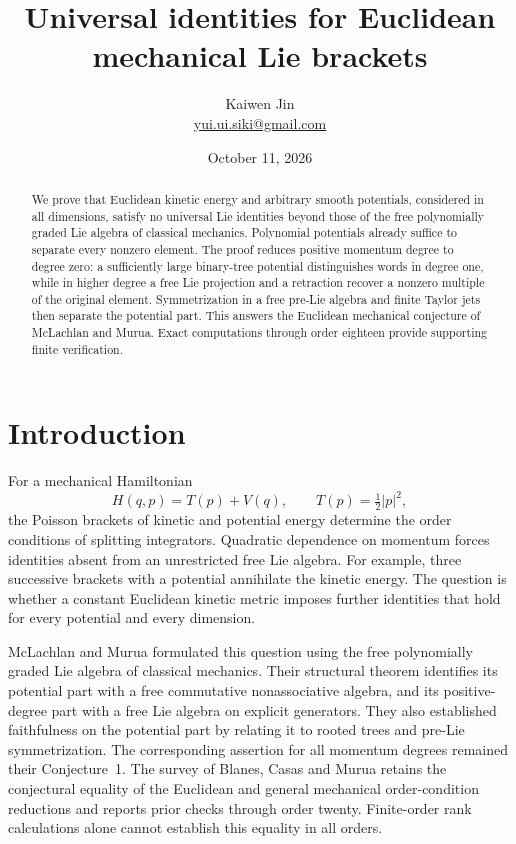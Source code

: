 \documentclass[11pt]{article}
\title{Universal identities for Euclidean mechanical Lie brackets}
\author{Kaiwen Jin\\\small\href{mailto:yui.ui.siki@gmail.com}{yui.ui.siki@gmail.com}}
\date{October 11, 2026}
\begin{document}
\maketitle
\begin{abstract}
We prove that Euclidean kinetic energy and arbitrary smooth potentials,
considered in all dimensions, satisfy no universal Lie identities beyond
those of the free polynomially graded Lie algebra of classical mechanics.
Polynomial potentials already suffice to separate every nonzero element.
The proof reduces positive momentum degree to degree zero: a sufficiently
large binary-tree potential distinguishes words in degree one, while in
higher degree a free Lie projection and a retraction recover a nonzero
multiple of the original element. Symmetrization in a free pre-Lie algebra
and finite Taylor jets then separate the potential part. This answers the
Euclidean mechanical conjecture of McLachlan and Murua. Exact computations
through order eighteen provide supporting finite verification.
\end{abstract}

\section{Introduction}

For a mechanical Hamiltonian
\[
 H(q,p)=T(p)+V(q),\qquad T(p)=\tfrac12\lvert p\rvert^2,
\]
the Poisson brackets of kinetic and potential energy determine the
order conditions of splitting integrators. Quadratic dependence on momentum
forces identities absent from an unrestricted free Lie algebra. For example,
three successive brackets with a potential annihilate the kinetic energy.
The question is whether a constant Euclidean kinetic metric imposes further
identities that hold for every potential and every dimension.

McLachlan and Murua \cite{MM} formulated this question using the free
polynomially graded Lie algebra of classical mechanics. Their structural
theorem identifies its potential part with a free commutative
nonassociative algebra, and its positive-degree part with a free Lie algebra
on explicit generators. They also established faithfulness on the potential
part by relating it to rooted trees and pre-Lie symmetrization. The
corresponding assertion for all momentum degrees remained their
Conjecture~1. The survey of Blanes, Casas and Murua \cite[\S3.1]{BCM} retains
the conjectural equality of the Euclidean and general mechanical
order-condition reductions and reports prior checks through order twenty.
Finite-order rank calculations alone cannot establish this equality in all
orders.
\end{document}
